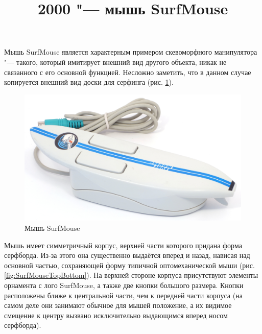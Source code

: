 \documentclass[11pt, a4paper]{article}
\begin{document}
\title{2000 "--- мышь SurfMouse}
\date{}
\maketitle
{}
Мышь SurfMouse является характерным примером скевоморфного манипулятора "--- такого, который имитирует внешний вид другого объекта, никак не связанного с его основной функцией. Несложно заметить, что в данном случае копируется внешний вид доски для серфинга (рис. \ref{fig:SurfMousePic}).

\begin{figure}[h]
    \centering
    \includegraphics[scale=0.4]{2000_surf_mouse/pic_60.jpg}
    \caption{Мышь SurfMouse}
    \label{fig:SurfMousePic}
\end{figure}

Мышь имеет симметричный корпус, верхней части которого придана форма серфборда. Из-за этого она существенно выдаётся вперед и назад, нависая над основной частью, сохраняющей форму типичной оптомеханической мыши (рис. \ref{fig:SurfMouseTopBottom}). На верхней стороне корпуса присутствуют элементы орнамента с лого SurfMouse, а также две кнопки большого размера. Кнопки расположены ближе к центральной части, чем к передней части корпуса (на самом деле они занимают обычное для мышей положение, а их видимое смещение к центру вызвано исключительно выдающимся вперед носом серфборда).
\end{document}
